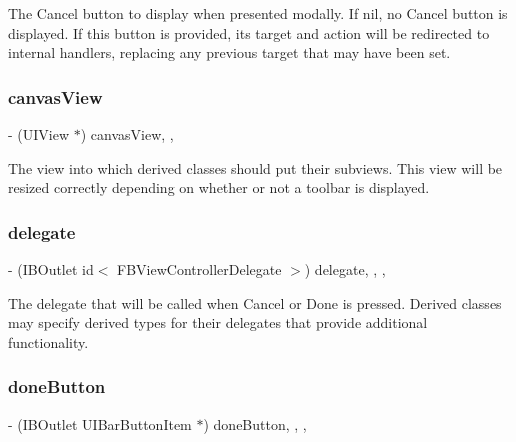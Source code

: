 The Cancel button to display when presented modally. If nil, no Cancel button is displayed. If this button is provided, its target and action will be redirected to internal handlers, replacing any previous target that may have been set. \mbox{\label{interfaceFBViewController_a854f912e8536ad03e99b9a6311d96d45}} 
\subsubsection{\texorpdfstring{canvas\+View}{canvasView}}
{\footnotesize\ttfamily -\/ (U\+I\+View $\ast$) canvas\+View\hspace{0.3cm}{\ttfamily [read]}, {\ttfamily [nonatomic]}, {\ttfamily [retain]}}

The view into which derived classes should put their subviews. This view will be resized correctly depending on whether or not a toolbar is displayed. \mbox{\label{interfaceFBViewController_a3503cf149369a8aec7f80369317f0af3}} 
\subsubsection{\texorpdfstring{delegate}{delegate}}
{\footnotesize\ttfamily -\/ (I\+B\+Outlet id$<$ F\+B\+View\+Controller\+Delegate $>$) delegate\hspace{0.3cm}{\ttfamily [read]}, {\ttfamily [write]}, {\ttfamily [nonatomic]}, {\ttfamily [assign]}}

The delegate that will be called when Cancel or Done is pressed. Derived classes may specify derived types for their delegates that provide additional functionality. \mbox{\label{interfaceFBViewController_abaf42501d996999bd284cb9b6ca7f867}} 
\subsubsection{\texorpdfstring{done\+Button}{doneButton}}
{\footnotesize\ttfamily -\/ (I\+B\+Outlet U\+I\+Bar\+Button\+Item $\ast$) done\+Button\hspace{0.3cm}{\ttfamily [read]}, {\ttfamily [write]}, {\ttfamily [nonatomic]}, {\ttfamily [retain]}}

